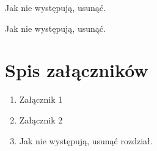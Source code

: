 \documentclass[a4paper,11pt,twoside]{report}
\theoremstyle{definition}
\begin{document}
\listoffigures
\thispagestyle{empty}
Jak nie występują, usunąć.


\renewcommand{\listtablename}{Spis tabel}
\listoftables
\thispagestyle{empty}
Jak nie występują, usunąć.



\chapter*{Spis załączników}
\begin{enumerate}
\item Załącznik 1
\item Załącznik 2
\item Jak nie występują, usunąć rozdział.
\end{enumerate}
\thispagestyle{empty}
\end{document}
